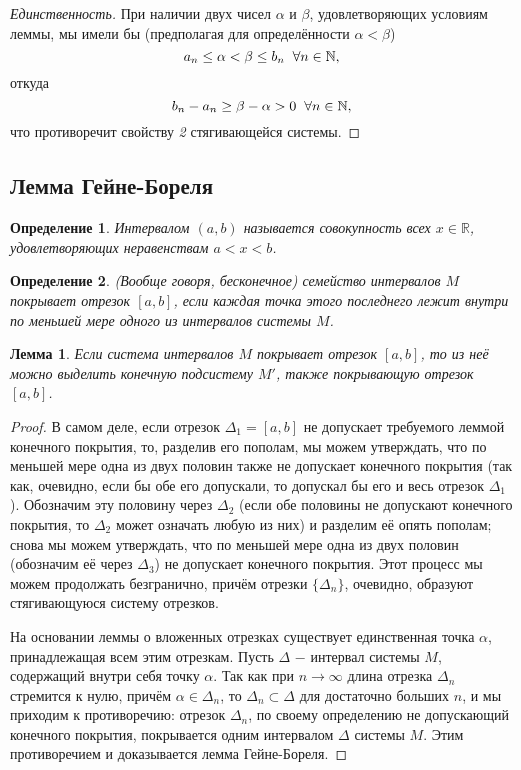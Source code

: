 \documentclass{article}
\newtheorem*{lemma}{Лемма}
\newtheorem{definition}{Определение}[section]
\begin{document}
\begin{proof}[Единственность]
При наличии двух чисел \(\alpha\) и \(\beta\), удовлетворяющих условиям леммы, мы имели бы (предполагая для определённости \(\alpha < \beta\))
\[
a_n \leq \alpha < \beta \leq b_n \hspace{2mm} \forall n \in \mathbb{N},
\]
откуда
\[
b_n - a_n \geq \beta - \alpha > 0 \hspace{2mm} \forall n \in \mathbb{N},
\]
что противоречит свойству \textit{2} стягивающейся системы.
\end{proof}

\subsection{Лемма Гейне-Бореля}

\begin{definition}
Интервалом \((a, b)\) называется совокупность всех \(x \in \mathbb{R}\), удовлетворяющих неравенствам \(a < x < b\).
\end{definition}

\begin{definition}
(Вообще говоря, бесконечное) семейство интервалов \(M\) покрывает отрезок \([a, b]\), если каждая точка этого последнего лежит внутри по меньшей мере одного из интервалов системы \(M\).
\end{definition}

\begin{lemma}
Если система интервалов \(M\) покрывает отрезок \([a, b]\), то из неё можно выделить конечную подсистему \(M'\), также покрывающую отрезок \([a, b]\).
\end{lemma}

\begin{proof}
В самом деле, если отрезок \(\Delta_1 = [a, b]\) не допускает требуемого леммой конечного покрытия, то, разделив его пополам, мы можем утверждать, что по меньшей мере одна из двух половин также не допускает конечного покрытия (так как, очевидно, если бы обе его допускали, то допускал бы его и весь отрезок \(\Delta_1\)). Обозначим эту половину через \(\Delta_2\) (если обе половины не допускают конечного покрытия, то \(\Delta_2\) может означать любую из них) и разделим её опять пополам; снова мы можем утверждать, что по меньшей мере одна из двух половин (обозначим её через \(\Delta_3\)) не допускает конечного покрытия. Этот процесс мы можем продолжать безгранично, причём отрезки \(\{\Delta_n\}\), очевидно, образуют стягивающуюся систему отрезков.

На основании леммы о вложенных отрезках существует единственная точка \(\alpha\), принадлежащая всем этим отрезкам. Пусть \(\Delta\) \(-\) интервал системы \(M\), содержащий внутри себя точку \(\alpha\). Так как при \(n \to \infty\) длина отрезка \(\Delta_n\) стремится к нулю, причём \(\alpha \in \Delta_n\), то \(\Delta_n \subset \Delta\) для достаточно больших \(n\), и мы приходим к противоречию: отрезок \(\Delta_n\), по своему определению не допускающий конечного покрытия, покрывается одним интервалом \(\Delta\) системы \(M\). Этим противоречием и доказывается лемма Гейне-Бореля.
\end{proof}
\end{document}
